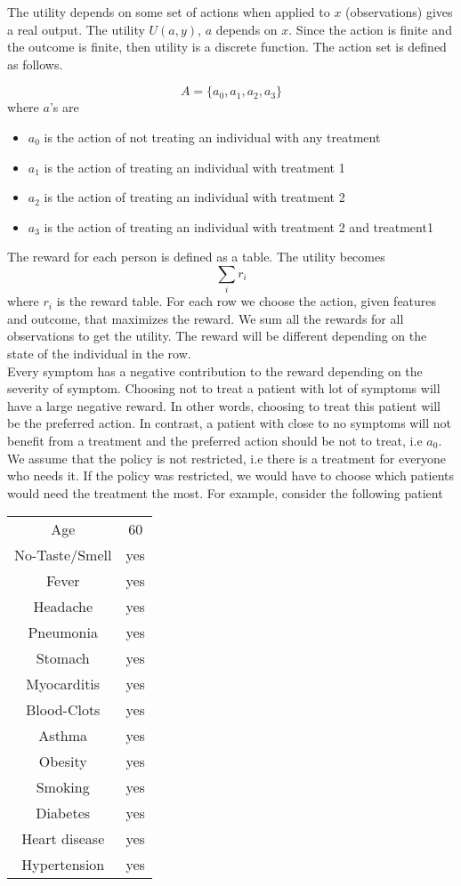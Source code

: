 \documentclass[a4paper, 12pt]{extarticle}
\begin{document}
The utility depends on some set of actions when applied to $x$ (observations) gives a real output. The utility $U(a,y)$, $a$ depends on $x$. Since the action is finite and the outcome is finite, then utility is a discrete function. The action set is defined as follows. 

$$ A= \{a_0,a_1,a_2,a_3 \} $$
where $a$'s are 
\begin{itemize}
    \item $a_0$ is the action of not treating an individual with any treatment
    \item $a_1$ is the action of treating an individual with treatment 1
    \item $a_2$ is the action of treating an individual with treatment 2
    \item $a_3$ is the action of treating an individual with treatment 2 and treatment1
\end{itemize}

The reward for each person is defined as a table. The utility becomes 
$$\sum_i r_i $$ 
where $r_i$ is the reward table. For each row we choose the action, given features and outcome, that maximizes the reward. We sum all the rewards for all observations to get the utility. The reward will be different depending on the state of the individual in the row. \\

\noindent Every symptom has a negative contribution to the reward depending on the severity of symptom. Choosing not to treat a patient with lot of symptoms will have a large negative reward. In other words, choosing to treat this patient will be the preferred action. In contrast, a patient with close to no symptoms will not benefit from a treatment and the preferred action should be not to treat, i.e $a_0$. We assume that the policy is not restricted, i.e there is a treatment for everyone who needs it. If the policy was restricted, we would have to choose which patients would need the treatment the most. For example, consider the following patient

\begin{center}
\begin{tabular}{ c c}
Age & 60  \\ 
No-Taste/Smell  & yes  \\ 
Fever  & yes \\ 
Headache  & yes \\ 
Pneumonia  & yes \\ 
Stomach  & yes \\ 
Myocarditis  & yes \\ 
Blood-Clots & yes \\ 
Asthma & yes \\ 
Obesity & yes \\ 
Smoking &  yes \\ 
Diabetes &  yes \\ 
Heart disease & yes \\ 
Hypertension & yes \\ 

\end{tabular}
\end{center}
\end{document}
